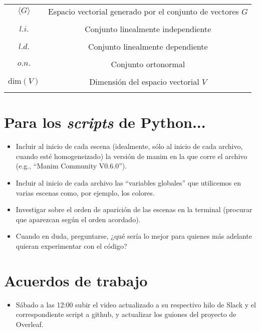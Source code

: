 \documentclass[12pt,dvipsnames]{article}
\numberwithin{equation}{section}
\begin{document}
\begin{tcolorbox}
\begin{tabular}{cc}
    $\langle G \rangle$ & Espacio vectorial generado por el conjunto de vectores $G$ \\ \\
    $l.i.$ & Conjunto linealmente independiente \\ \\
    $l.d.$ & Conjunto linealmente dependiente \\ \\
    $o.n.$ & Conjunto ortonormal \\ \\
    $\text{dim}(V)$ & Dimensión del espacio vectorial $V$ \\ \\

\end{tabular}
\end{tcolorbox}

\section{Para los \emph{scripts} de Python...}

\begin{itemize}
    \item Incluir al inicio de cada escena (idealmente, sólo al inicio de cada archivo, cuando esté homogeneizado) la versión de manim en la que corre el archivo (e.g., ``Manim Community V0.6.0'').
    
    \item Incluir al inicio de cada archivo las ``variables globales'' que utilicemos en varias escenas como, por ejemplo, los colores.
    
    \item Investigar sobre el orden de aparición de las escenas en la terminal (procurar que aparezcan según el orden acordado).
    
    \item Cuando en duda, preguntarse, ¿qué sería lo mejor para quienes más adelante quieran experimentar con el código?
    
\end{itemize}

\section{Acuerdos de trabajo}

\begin{itemize}
    \item Sábado a las 12:00 subir el video actualizado a su respectivo hilo de Slack y el correspondiente script a github, y actualizar los guiones del proyecto de Overleaf.
    
   
\end{itemize}
\end{document}
